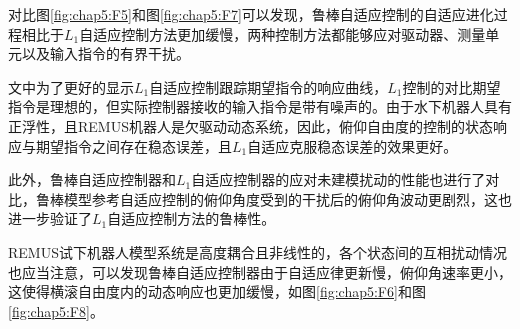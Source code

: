 对比图\ref{fig:chap5:F5}和图\ref{fig:chap5:F7}可以发现，鲁棒自适应控制的自适应进化过程相比于$L_1$自适应控制方法更加缓慢，两种控制方法都能够应对驱动器、测量单元以及输入指令的有界干扰。

文中为了更好的显示$L_1$自适应控制跟踪期望指令的响应曲线，$L_1$控制的对比期望指令是理想的，但实际控制器接收的输入指令是带有噪声的。由于水下机器人具有正浮性，且REMUS机器人是欠驱动动态系统，因此，俯仰自由度的控制的状态响应与期望指令之间存在稳态误差，且$L_1$自适应克服稳态误差的效果更好。


此外，鲁棒自适应控制器和$L_1$自适应控制器的应对未建模扰动的性能也进行了对比，鲁棒模型参考自适应控制的俯仰角度受到的干扰后的俯仰角波动更剧烈，这也进一步验证了$L_1$自适应控制方法的鲁棒性。

REMUS试下机器人模型系统是高度耦合且非线性的，各个状态间的互相扰动情况也应当注意，可以发现鲁棒自适应控制器由于自适应律更新慢，俯仰角速率更小，这使得横滚自由度内的动态响应也更加缓慢，如图\ref{fig:chap5:F6}和图\ref{fig:chap5:F8}。

